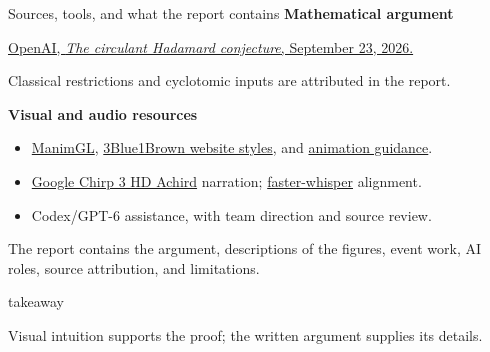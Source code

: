 \documentclass[aspectratio=169,11pt]{beamer}
\newcommand{\takeaway}[1]{%
  \par\smallskip
  \begin{beamercolorbox}[wd=\dimexpr\linewidth-12mm\relax,sep=1.5mm]{takeaway}
    \small\strut#1
  \end{beamercolorbox}%
}
\begin{document}
\begin{frame}{Sources, tools, and what the report contains}
  \small
  \textbf{Mathematical argument}
  \par\href{https://github.com/openai/math/blob/main/preprints/The-circulant-Hadamard-conjecture-September-23-2026/paper.pdf}
    {OpenAI, \emph{The circulant Hadamard conjecture}, September 23, 2026.}
  \par Classical restrictions and cyclotomic inputs are attributed in the report.

  \medskip
  \textbf{Visual and audio resources}
  \begin{itemize}
    \item \href{https://github.com/3b1b/manim}{ManimGL},
      \href{https://github.com/3b1b/3Blue1Brown.com}{3Blue1Brown website styles},
      and \href{https://github.com/3b1b/videos}{animation guidance}.
    \item \href{https://docs.cloud.google.com/text-to-speech/docs/chirp3-hd}
      {Google Chirp 3 HD Achird} narration;
      \href{https://github.com/SYSTRAN/faster-whisper}{faster-whisper} alignment.
    \item Codex/GPT-6 assistance, with team direction and source review.
  \end{itemize}
  \medskip
  The report contains the argument, descriptions of the figures, event work,
  AI roles, source attribution, and limitations.
  \takeaway{Visual intuition supports the proof; the written argument supplies its details.}
\end{frame}
\end{document}
